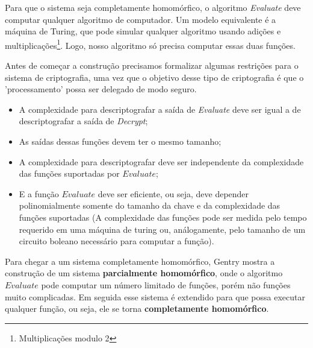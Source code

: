 Para que o sistema seja completamente homomórfico, o algoritmo \textit{Evaluate} deve computar qualquer algoritmo de computador. Um modelo equivalente é a máquina de Turing, que pode simular qualquer algoritmo usando adições e multiplicações\footnote{Multiplicações modulo 2}. Logo, nosso algoritmo só precisa computar essas duas funções.

Antes de começar a construção precisamos formalizar algumas restrições para o sistema de criptografia, uma vez que o objetivo desse tipo de criptografia é que o 'processamento' possa ser delegado de modo seguro.
\begin{itemize}
	\item A complexidade para descriptografar a saída de \textit{Evaluate} deve ser igual a de descriptografar a saída de \textit{Decrypt};
	\item As saídas dessas funções devem ter o mesmo tamanho;
	\item A complexidade para descriptografar deve ser independente da complexidade das funções suportadas por $Evaluate$;
	\item E a função $Evaluate$ deve ser eficiente, ou seja, deve depender polinomialmente somente do tamanho da chave e da complexidade das funções suportadas (A complexidade das funções pode ser medida pelo tempo requerido em uma máquina de turing ou, análogamente, pelo tamanho de um circuito boleano necessário para computar a função).
\end{itemize}

Para chegar a um sistema completamente homomórfico, Gentry mostra a construção de um sistema \textbf{parcialmente homomórfico}, onde o algoritmo $Evaluate$ pode computar um número limitado de funções, porém não funções muito complicadas. Em seguida esse sistema é extendido para que possa executar qualquer função, ou seja, ele se torna \textbf{completamente homomórfico}.

